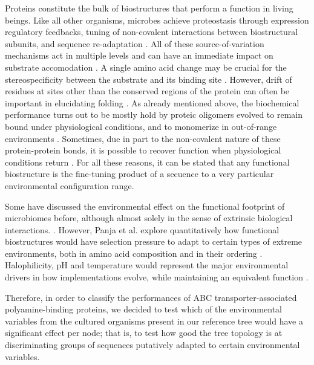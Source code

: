\documentclass[Journal,letterpaper,NoLists]{ascelike-new}
\begin{document}
Proteins constitute the bulk of biostructures that perform a function in living beings. Like all other organisms, microbes achieve proteostasis through expression regulatory feedbacks, tuning of non-covalent interactions between biostructural subunits, and sequence re-adaptation \cite{ullmann1968subunit,gidalevitz2011stress,manara2012pseudomonas}. All of these source-of-variation mechanisms act in multiple levels and can have an immediate impact on substrate accomodation \cite{thompson1999liver}. A single amino acid change may be crucial for the stereospecificity between the substrate and its binding site \cite{gierse1996single,price2022interactive}. However, drift of residues at sites other than the conserved regions of the protein can often be important in elucidating folding \cite{sadowski2009sequence}. As already mentioned above, the biochemical performance turns out to be mostly hold by proteic oligomers evolved to remain bound under physiological conditions, and to monomerize in out-of-range environments \cite{traut1994dissociation}. Sometimes, due in part to the non-covalent nature of these protein-protein bonds, it is possible to recover function when physiological conditions return \cite{traut1994dissociation}. For all these reasons, it can be stated that any functional biostructure is the fine-tuning product of a secuence to a very particular environmental configuration range.

Some have discussed the environmental effect on the functional footprint of microbiomes before, although almost solely in the sense of extrinsic biological interactions. \cite{rio2003comparative,spor2011unravelling}. However, Panja et al. explore quantitatively how functional biostructures would have selection pressure to adapt to certain types of extreme environments, both in amino acid composition and in their ordering \cite{panja2020protein}. Halophilicity, pH and temperature would represent the major environmental drivers in how implementations evolve, while maintaining an equivalent function \cite{panja2020protein}.

Therefore, in order to classify the performances of ABC transporter-associated polyamine-binding proteins, we decided to test which of the environmental variables from the cultured organisms present in our reference tree would have a significant effect per node; that is, to test how good the tree topology is at discriminating groups of sequences putatively adapted to certain environmental variables. 
\end{document}
